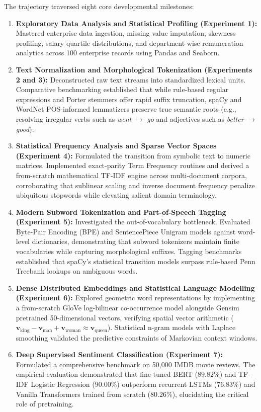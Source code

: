 \documentclass[12pt,a4paper]{report}
\begin{document}
The trajectory traversed eight core developmental milestones:
\begin{enumerate}
    \item \textbf{Exploratory Data Analysis and Statistical Profiling (Experiment 1):} Mastered enterprise data ingestion, missing value imputation, skewness profiling, salary quartile distributions, and department-wise remuneration analytics across 100 enterprise records using Pandas and Seaborn.
    \item \textbf{Text Normalization and Morphological Tokenization (Experiments 2 and 3):} Deconstructed raw text streams into standardized lexical units. Comparative benchmarking established that while rule-based regular expressions and Porter stemmers offer rapid suffix truncation, spaCy and WordNet POS-informed lemmatizers preserve true semantic roots (e.g., resolving irregular verbs such as \textit{went} $\to$ \textit{go} and adjectives such as \textit{better} $\to$ \textit{good}).
    \item \textbf{Statistical Frequency Analysis and Sparse Vector Spaces (Experiment 4):} Formulated the transition from symbolic text to numeric matrices. Implemented exact-parity Term Frequency routines and derived a from-scratch mathematical TF-IDF engine across multi-document corpora, corroborating that sublinear scaling and inverse document frequency penalize ubiquitous stopwords while elevating salient domain terminology.
    \item \textbf{Modern Subword Tokenization and Part-of-Speech Tagging (Experiment 5):} Investigated the out-of-vocabulary bottleneck. Evaluated Byte-Pair Encoding (BPE) and SentencePiece Unigram models against word-level dictionaries, demonstrating that subword tokenizers maintain finite vocabularies while capturing morphological suffixes. Tagging benchmarks established that spaCy's statistical transition models surpass rule-based Penn Treebank lookups on ambiguous words.
    \item \textbf{Dense Distributed Embeddings and Statistical Language Modelling (Experiment 6):} Explored geometric word representations by implementing a from-scratch GloVe log-bilinear co-occurrence model alongside Gensim pretrained 50-dimensional vectors, verifying spatial vector arithmetic ($\mathbf{v}_{\text{king}} - \mathbf{v}_{\text{man}} + \mathbf{v}_{\text{woman}} \approx \mathbf{v}_{\text{queen}}$). Statistical n-gram models with Laplace smoothing validated the predictive constraints of Markovian context windows.
    \item \textbf{Deep Supervised Sentiment Classification (Experiment 7):} Formulated a comprehensive benchmark on 50,000 IMDB movie reviews. The empirical evaluation demonstrated that fine-tuned BERT ($\mathbf{89.82\%}$) and TF-IDF Logistic Regression ($\mathbf{90.00\%}$) outperform recurrent LSTMs ($\mathbf{76.83\%}$) and Vanilla Transformers trained from scratch ($\mathbf{80.26\%}$), elucidating the critical role of pretraining.

\end{enumerate}
\end{document}
